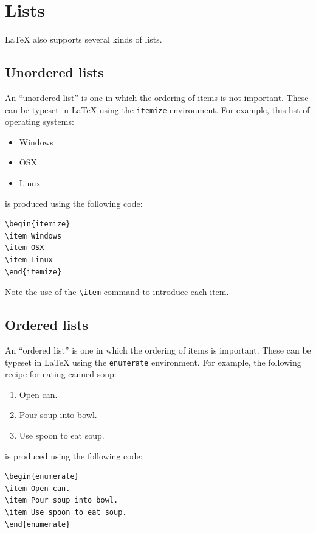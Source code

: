 \documentclass{article}
\newcommand*{\code}[1]{\texttt{#1}}
\begin{document}
\section{Lists}
\label{s:lists}
\LaTeX{} also supports several kinds of lists.

\subsection{Unordered lists}
\label{s:unordlist}
An \enquote{unordered list} is one in which the ordering of items is not important.
These can be typeset in \LaTeX{} using the \code{itemize} environment.
For example, this list of operating systems:
\begin{itemize}
\item Windows
\item OSX
\item Linux
\end{itemize}
is produced using the following code:
\begin{verbatim}
\begin{itemize}
\item Windows
\item OSX
\item Linux
\end{itemize}
\end{verbatim}

Note the use of the \code{\textbackslash{}item} command to introduce each item.

\subsection{Ordered lists}
\label{s:ordlist}
An \enquote{ordered list} is one in which the ordering of items is important.
These can be typeset in \LaTeX{} using the \code{enumerate} environment.
For example, the following recipe for eating canned soup:
\begin{enumerate}
\item Open can.
\item Pour soup into bowl.
\item Use spoon to eat soup.
\end{enumerate}
is produced using the following code:
\begin{verbatim}
\begin{enumerate}
\item Open can.
\item Pour soup into bowl.
\item Use spoon to eat soup.
\end{enumerate}
\end{verbatim}
\end{document}
